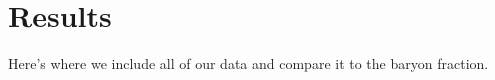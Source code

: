 \chapter{Results}
\label{c.Results}
Here's where we include all of our data and compare it to the baryon
fraction.
